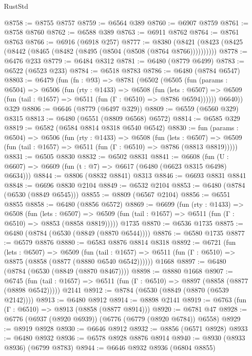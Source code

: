 \begin{lexlean}{RustStd}
\begin{coremodule}
@8758 := @8755 @8757
@8759 := @6564 @389
@8760 := @6907 @8759
@8761 := @8758 @8760
@8762 := @6588 @389
@8763 := @6911 @8762
@8764 := @8761 @8763
@8766 := @6916 (@6918 @257)
@8777 := @8380 (@8421 (@8423 (@8425 (@8442 (@8465 (@8482 (@8495 (@8504 (@8508 (@8764 @8766))))))))))
@8778 := @6476 @233
@8779 := @6484 @8312
@8781 := @6480 (@8779 @6499)
@8783 := @6522 (@6523 @233)
@8784 := @6518 @8783
@8786 := @6480 (@8784 @6547)
@8803 := @6479
    (fun (fn : @93) =>
    @8781
      (@6502
        (@6505
          (fun (params : @6504) =>
          @6506
            (fun (rty : @1433) =>
            @6508
              (fun (lets : @6507) =>
              @6509 (fun (tail : @1657) => @6511 (fun (Γ : @6510) => @8786 @6594))))))
        @6640))
    @329
@8806 := @6646 (@8779 (@6497 @329))
@8809 := @6559 (@6560 @329) @8315
@8813 := @6480 (@6551 (@8809 @6568) @6572)
@8814 := @6585 @329
@8819 := @6582 (@6584 @8814 @8318 @6540 @6542)
@8830 := fun (params : @6504) =>
  @6506
    (fun (rty : @1433) =>
    @6508
      (fun (lets : @6507) =>
      @6509 (fun (tail : @1657) => @6511 (fun (Γ : @6510) => @8786 (@8813 @8819)))))
@8831 := @6505 @8830
@8832 := @6502 @8831
@8841 := @6608 (fun (U : @6607) => @6609 (fun (t : @7) => @6617 (@6480 (@6623 @8315 @6498) @6634)))
@8844 := @8806 (@8832 @8841) @8313
@8846 := @6693 @8831 @8841
@8848 := @6696 @8830 @2104
@8849 := @6532 @2104
@8853 := @6480 (@8784 (@6530 (@8849 @6545)))
@8855 := @8809 (@6567 @2104)
@8856 := @6551 @8855
@8858 := @6480 (@8856 @6572)
@8869 := @6699
    (fun (rty : @1433) =>
    @6508
      (fun (lets : @6507) =>
      @6509 (fun (tail : @1657) => @6511 (fun (Γ : @6510) => @8853 (@8858 @8819)))))
    @1735
@8870 := @6536 @1735
@8875 := @6480 (@8784 (@6530 (@8849 (@8870 @6544))))
@8876 := @6580 @1735
@8877 := @6579 @8876
@8880 := @6583 @8876 @8814 @8318
@8892 := @6721
    (fun (lets : @6507) =>
    @6509
      (fun (tail : @1657) => @6511 (fun (Γ : @6510) => @8875 (@8858 (@8877 (@8880 @6540 @6542))))))
    @1668
@8897 := @6480 (@8784 (@6530 (@8849 (@8870 @8467))))
@8898 := @8880 @1668
@8907 := @6745
    (fun (tail : @1657) => @6511 (fun (Γ : @6510) => @8897 (@8858 (@8877 (@8898 @6542)))))
    @2141
@8912 := @8784 (@6530 (@8849 (@8870 (@6539 @2142))))
@8913 := @6480 @8912
@8914 := @8898 @2141
@8919 := @6763 (fun (Γ : @6510) => @8913 (@8858 (@8877 @8914)))
@8920 := @6781 @47
@8928 := @6776 (@6937 (@8920 @6939)) (@6776 (@6779 (@8920 @6784)) @6558)
@8929 := @8919 @8928
@8930 := @6646 @8912
@8932 := @8856 (@6571 @8928)
@8933 := @6480 @8932
@8936 := @6578 @8928 @8876 @8914
@8940 := @8930 (@8933 @8936) (@6799 @8783)
@8944 := @6646 @8932 @8936 (@6804 @8855)

\end{coremodule}
\end{lexlean}
